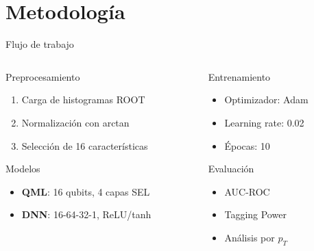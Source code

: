 \documentclass[aspectratio=169]{beamer}
\begin{document}
\section{Metodología}
\begin{frame}{Flujo de trabajo}
  \begin{columns}
    \begin{column}{0.48\textwidth}
      \begin{block}{Preprocesamiento}
        \begin{enumerate}
          \item Carga de histogramas ROOT
          \item Normalización con arctan
          \item Selección de 16 características
        \end{enumerate}
      \end{block}
      \vspace{-0.2em}
      \begin{block}{Modelos}
        \begin{itemize}
          \item \textbf{QML}: 16 qubits, 4 capas SEL
          \item \textbf{DNN}: 16-64-32-1, ReLU/tanh
        \end{itemize}
      \end{block}
    \end{column}
    \begin{column}{0.48\textwidth}
      \begin{alertblock}{Entrenamiento}
        \begin{itemize}
          \item Optimizador: Adam
          \item Learning rate: 0.02
          \item Épocas: 10
        \end{itemize}
      \end{alertblock}
      \vspace{-0.2em}
      \begin{block}{Evaluación}
        \begin{itemize}
          \item AUC-ROC
          \item Tagging Power
          \item Análisis por \texorpdfstring{$p_T$}{pT}
        \end{itemize}
      \end{block}
    \end{column}
  \end{columns}
\end{frame}
\end{document}
